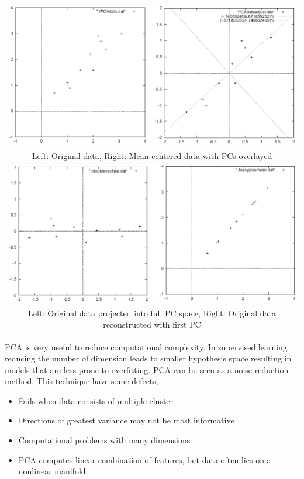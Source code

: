 \documentclass[../main.tex]{subfiles}
\begin{document}
\begin{center}
    \begin{tabular}{c}
        \includegraphics[width=140mm]{images/PAC_1.PNG}                                                    \\
        Left: Original data, Right: Mean centered data with PCs overlayed                                  \\[6pt]
        \includegraphics[width=140mm]{images/PAC_2.PNG}                                                    \\
        Left: Original data projected into full PC space, Right: Original data reconstructed with first PC \\[6pt]
    \end{tabular}
\end{center}

PCA is very useful to reduce computational complexity. In supervised learning reducing the number of dimension leads to smaller hypothesis space resulting in models that are less prone to overfitting. PCA can be seen as a noise reduction method.
This technique have some defects,
\begin{itemize}
    \item Fails when data consists of multiple cluster
    \item Directions of greatest variance may not be most informative
    \item Computational problems with many dimensions
    \item PCA computes linear combination of features, but data often lies on a nonlinear manifold
\end{itemize}
\end{document}
